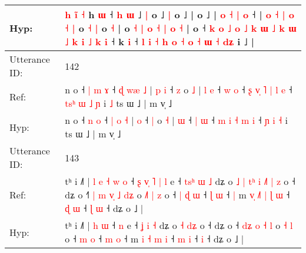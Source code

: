 \documentclass[10pt]{article}
\DeclareRobustCommand{\hl}[1]{{\textcolor{red}{#1}}}
\begin{document}
\begin{longtable}{ll}
 \\
Hyp: & \hl{}\hl{h} \hl{}\hl{i}\hl{̃} \hl{˧} h \hl{ɯ} ˧\hl{}\hl{}\hl{}\hl{}\hl{}\hl{} \hl{h} \hl{ɯ} ˩ \hl{|} o ˩ \hl{}\hl{|} o ˩ |\hl{}\hl{} o\hl{}\hl{}\hl{}\hl{}\hl{} ˩\hl{} | \hl{}\hl{o} \hl{˧} \hl{|} \hl{}\hl{o} ˧ |\hl{}\hl{} \hl{o} \hl{˧} \hl{|} \hl{o} \hl{˧} \hl{|} o \hl{˧} \hl{}\hl{|} o \hl{˧} |\hl{}\hl{} o \hl{˧} \hl{}\hl{|} \hl{}\hl{o} \hl{˧} \hl{|} \hl{o} \hl{˧} | o\hl{}\hl{}\hl{}\hl{}\hl{}\hl{}\hl{} ˧ \hl{k} \hl{o} \hl{˩} \hl{o} \hl{˩} \hl{k} \hl{ɯ} \hl{}\hl{˩} \hl{k} \hl{ɯ} \hl{˩} \hl{}\hl{k} \hl{}\hl{i} \hl{˩} \hl{}\hl{}\hl{k} \hl{i} ˧ k\hl{} \hl{}\hl{i} ˧\hl{}\hl{} \hl{}\hl{l} \hl{i} \hl{}\hl{˧} \hl{h} \hl{o} \hl{}\hl{˧} \hl{o} \hl{˧} \hl{}\hl{ɯ} \hl{˧} \hl{}\hl{d}\hl{ʑ} i ˩ |
 \\
\midrule
Utterance ID: & 142 \\
Ref: & n o ˧\hl{ }\hl{|} \hl{m} \hl{ɤ} ˧ \hl{ɖ} \hl{w}\hl{æ} \hl{˩} |\hl{ }\hl{p} \hl{i} ˧ \hl{z} o \hl{˩} |\hl{ }\hl{l} \hl{e} ˧ \hl{w} \hl{o} ˧\hl{ }\hl{ʂ} \hl{v}\hl{̩} \hl{˥} \hl{|} \hl{l} \hl{e} ˧\hl{ }\hl{t}\hl{s}\hl{ʰ} \hl{ɯ} \hl{˩} \hl{ɲ} i\hl{ }\hl{˩} ts ɯ ˩ | m v̩ ˩
 \\
Hyp: & n o ˧\hl{}\hl{} \hl{n} \hl{o} ˧ \hl{|} \hl{}\hl{o} \hl{˧} |\hl{}\hl{} \hl{o} ˧ \hl{|} o \hl{˧} |\hl{}\hl{} \hl{ɯ} ˧ \hl{|} \hl{ɯ} ˧\hl{}\hl{} \hl{}\hl{m} \hl{i} \hl{˧} \hl{m} \hl{i} ˧\hl{}\hl{}\hl{}\hl{} \hl{ɲ} \hl{i} \hl{˧} i\hl{}\hl{} ts ɯ ˩ | m v̩ ˩
 \\
\midrule
Utterance ID: & 143 \\
Ref: & tʰ i ˩˥ |\hl{ }\hl{l}\hl{ }\hl{e}\hl{ }\hl{˧} \hl{w} \hl{o} ˧\hl{ }\hl{ʂ}\hl{ }\hl{v}\hl{̩}\hl{ }\hl{˥}\hl{ }\hl{|} \hl{l} e ˧ \hl{t}\hl{s}\hl{ʰ} \hl{ɯ} \hl{˩} dʑ o\hl{ }\hl{˩}\hl{ }\hl{|}\hl{ }\hl{t}\hl{ʰ}\hl{ }\hl{i} \hl{˩}\hl{˥} \hl{|}\hl{ }\hl{z} o ˧ dʑ o ˧\hl{˥} \hl{|}\hl{ }\hl{m} \hl{v}\hl{̩} \hl{˩} \hl{d}\hl{ʑ} o\hl{ }\hl{˩}\hl{˥} \hl{|} \hl{z} o ˧\hl{ }\hl{|} \hl{ɖ} \hl{ɯ} ˧ \hl{ɭ} \hl{ɯ} ˧\hl{ }\hl{|} m\hl{ }\hl{v}\hl{̩} \hl{˩}\hl{˥} \hl{|} \hl{ɭ} \hl{ɯ} ˧ \hl{ɖ} \hl{ɯ} ˧\hl{ }\hl{ɭ} \hl{ɯ} ˧ dʑ o ˩ |
 \\
Hyp: & tʰ i ˩˥ |\hl{}\hl{}\hl{}\hl{}\hl{}\hl{} \hl{h} \hl{ɯ} ˧\hl{}\hl{}\hl{}\hl{}\hl{}\hl{}\hl{}\hl{}\hl{} \hl{n} e ˧ \hl{}\hl{}\hl{ʝ} \hl{i} \hl{˧} dʑ o\hl{}\hl{}\hl{}\hl{}\hl{}\hl{}\hl{}\hl{}\hl{} \hl{}\hl{˧} \hl{}\hl{d}\hl{ʑ} o ˧ dʑ o ˧\hl{} \hl{}\hl{d}\hl{ʑ} \hl{}\hl{o} \hl{˧} \hl{}\hl{l} o\hl{}\hl{}\hl{} \hl{˧} \hl{l} o ˧\hl{}\hl{} \hl{m} \hl{o} ˧ \hl{m} \hl{o} ˧\hl{}\hl{} m\hl{}\hl{}\hl{} \hl{}\hl{i} \hl{˧} \hl{m} \hl{i} ˧ \hl{m} \hl{i} ˧\hl{}\hl{} \hl{i} ˧ dʑ o ˩ |
 \\

\end{longtable}
\end{document}
